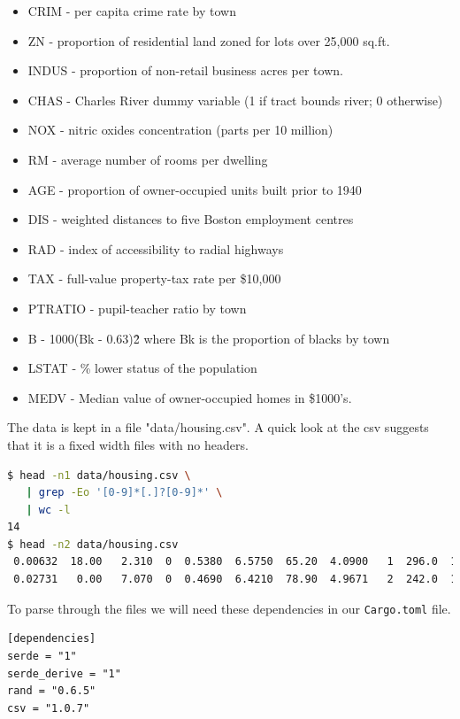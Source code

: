 \documentclass{book}
\begin{document}
\begin{itemize}
	\item CRIM - per capita crime rate by town
	\item ZN - proportion of residential land zoned for lots over 25,000 sq.ft.
	\item INDUS - proportion of non-retail business acres per town.
	\item CHAS - Charles River dummy variable (1 if tract bounds river; 0 otherwise)
	\item NOX - nitric oxides concentration (parts per 10 million)
	\item RM - average number of rooms per dwelling
	\item AGE - proportion of owner-occupied units built prior to 1940
	\item DIS - weighted distances to five Boston employment centres
	\item RAD - index of accessibility to radial highways
	\item TAX - full-value property-tax rate per \$10,000
	\item PTRATIO - pupil-teacher ratio by town
	\item B - 1000(Bk - 0.63)\^2 where Bk is the proportion of blacks by town
	\item LSTAT - \% lower status of the population
	\item MEDV - Median value of owner-occupied homes in \$1000's.
\end{itemize}

The data is kept in a file "data/housing.csv". A quick look at the csv suggests that it is a fixed width files with no headers.

\begin{lstlisting}[language=bash,caption={housing data}]
$ head -n1 data/housing.csv \
   | grep -Eo '[0-9]*[.]?[0-9]*' \
   | wc -l
14
$ head -n2 data/housing.csv
 0.00632  18.00   2.310  0  0.5380  6.5750  65.20  4.0900   1  296.0  15.30 396.90   4.98  24.00
 0.02731   0.00   7.070  0  0.4690  6.4210  78.90  4.9671   2  242.0  17.80 396.90   9.14  21.60
\end{lstlisting}

To parse through the files we will need these dependencies in our \lstinline{Cargo.toml} file.

\begin{lstlisting}[caption={Cargo.toml}]
[dependencies]
serde = "1"
serde_derive = "1"
rand = "0.6.5"
csv = "1.0.7"
\end{lstlisting}
\end{document}
